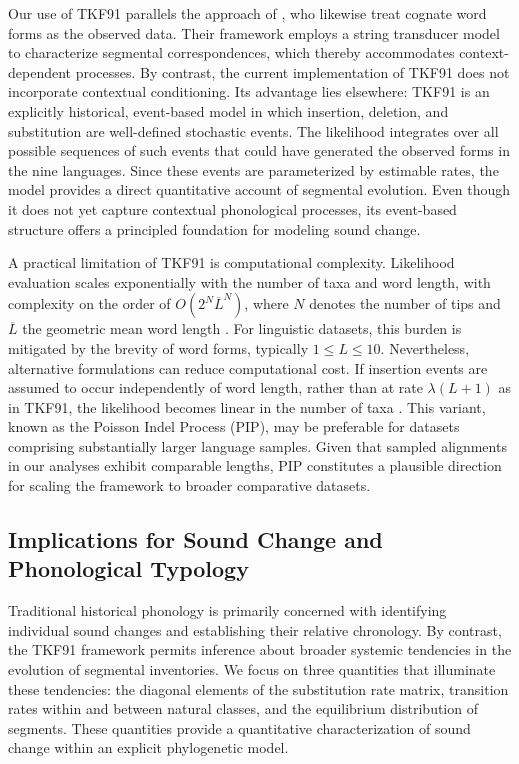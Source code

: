 \documentclass[numsec,webpdf,modern,large,namedate]{oup-authoring-template}
\begin{document}
Our use of TKF91 parallels the approach of \citet{BouchardCote2013}, who likewise treat cognate word forms as the observed data. Their framework employs a string transducer model \citep{Holmes2001} to characterize segmental correspondences, which thereby accommodates context-dependent processes. By contrast, the current implementation of TKF91 does not incorporate contextual conditioning. Its advantage lies elsewhere: TKF91 is an explicitly historical, event-based model in which insertion, deletion, and substitution are well-defined stochastic events. The likelihood integrates over all possible sequences of such events that could have generated the observed forms in the nine languages. Since these events are parameterized by estimable rates, the model provides a direct quantitative account of segmental evolution. Even though it does not yet capture contextual phonological processes, its event-based structure offers a principled foundation for modeling sound change. 

A practical limitation of TKF91 is computational complexity. Likelihood evaluation scales exponentially with the number of taxa and word length, with complexity on the order of $O(2^{\textit{N}}\overline L^{\textit{N}})$, where $\textit{N}$ denotes the number of tips and $\overline L$ the geometric mean word length \citep{Lunter2003}. For linguistic datasets, this burden is mitigated by the brevity of word forms, typically $1\leq L\leq 10$. Nevertheless, alternative formulations can reduce computational cost. If insertion events are assumed to occur independently of word length, rather than at rate $\lambda (L+ 1)$ as in TKF91, the likelihood becomes linear in the number of taxa \citep{BouchardCote2013b}. This variant, known as the Poisson Indel Process (PIP), may be preferable for datasets comprising substantially larger language samples. Given that sampled alignments in our analyses exhibit comparable lengths, PIP constitutes a plausible direction for scaling the framework to broader comparative datasets. 

\subsection{Implications for Sound Change and Phonological Typology}
\label{PaperSections_InsightsSoundChange}
Traditional historical phonology is primarily concerned with identifying individual sound changes and establishing their relative chronology. By contrast, the TKF91 framework permits inference about broader systemic tendencies in the evolution of segmental inventories. We focus on three quantities that illuminate these tendencies: the diagonal elements of the substitution rate matrix, transition rates within and between natural classes, and the equilibrium distribution of segments. These quantities provide a quantitative characterization of sound change within an explicit phylogenetic model. 
\end{document}
